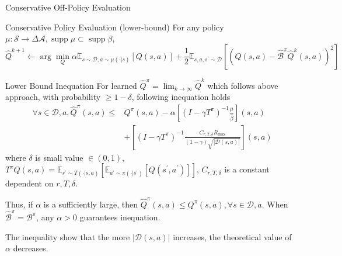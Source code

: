\documentclass[11pt]{beamer}
\newcommand{\mbb}[1]{\mathbb{#1}}
\newcommand{\mc}[1]{\mathcal{#1}}
\newcommand{\abs}[1]{\left\lvert #1 \right\rvert}
\newcommand{\supp}{\operatorname{supp}}
\begin{document}
\begin{frame}{Conservative Off-Policy Evaluation}
  \begin{block}{Conservative Policy Evaluation (lower-bound)}
    For any policy $\mu : \mc{S} \to \Delta{\mc{A}}, \supp \mu \subset \supp \beta$,
    \begin{equation} \label{eq:1}
      \hat{Q}^{k+1} \leftarrow \arg \min_{Q} \alpha \mbb{E}_{s \sim \mc{D}, a \sim \mu(\cdot|s)}[Q(s,a)] + \frac{1}{2} \mbb{E}_{s,a, s^\prime \sim \mc{D}} \left[\left(Q(s,a) - \hat{\mc{B}}^\pi \hat{Q}^k (s,a)\right)^2\right]
    \end{equation}

  \end{block}
  
  \begin{block}{Lower Bound Inequation}
    For learned $\hat{Q}^\pi = \lim_{k \to \infty} \hat{Q}^k$ which follows above approach, with probability $\geq 1-\delta$, following inequation holds
    \[
    \begin{aligned}
      \forall s \in \mc{D}, a, \hat{Q}^\pi(s,a) \leq &Q^\pi(s,a) - \alpha \left[(I - \gamma T^\pi)^{-1} \frac{\mu}{\hat{\beta}}\right](s,a) \\
      &+\left[(I-\gamma T^\pi)^{-1} \frac{C_{r,T,\delta}R_{\text{max}}}{(1-\gamma)\sqrt{\abs{\mc{D}(s,a)}}}\right](s,a)
    \end{aligned}
    \]
    where $\delta$ is small value $\in (0,1)$, $T^\pi Q(s,a)= \mbb{E}_{s^\prime \sim T(\cdot|s,a)}[\mbb{E}_{a^\prime \sim \pi(\cdot|s^\prime)}[Q(s^\prime,a^\prime)]]$, $C_{r,T,\delta}$ is a constant dependent on $r, T, \delta$.

    Thus, if $\alpha$ is a sufficiently large, then $\hat{Q}^\pi (s,a) \leq Q^\pi(s,a), \forall s\in \mc{D},a$.
    When $\hat{\mc{B}}^\pi = \mc{B}^\pi$, any $\alpha > 0$ guarantees inequation.
  \end{block}
    The inequality show that the more $\abs{\mc{D}(s,a)}$ increases, the theoretical value of $\alpha$ decreases.
\end{frame}
\end{document}
